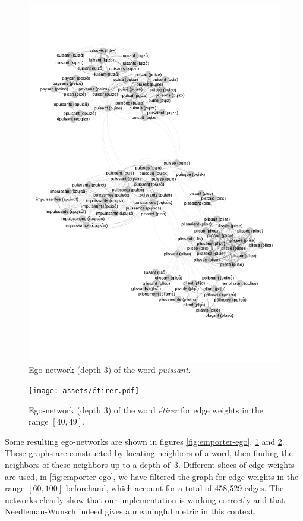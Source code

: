 \begin{figure}[H]
    \centering
    \includegraphics[width=\linewidth, trim=1cm 3.4cm 0.5cm 3.2cm, clip]{assets/puissant-ego.pdf}
    \caption{Ego-network (depth 3) of the word \textit{puissant}.}
    \label{fig:puissant-ego}
\end{figure}

\begin{figure}[H]
    \centering
    \texttt{[image: assets/étirer.pdf]}
    \caption{Ego-network (depth 3) of the word \textit{étirer} for edge weights in the range $[40,49]$.}
    \label{fig:etirer-ego}
\end{figure}

Some resulting ego-networks are shown in figures \ref{fig:emporter-ego}, \ref{fig:puissant-ego} and \ref{fig:etirer-ego}. These graphs are constructed by locating neighbors of a word, then finding the neighbors of these neighbors up to a depth of~3. Different slices of edge weights are used, \eg in \autoref{fig:emporter-ego}, we have filtered the graph for edge weights in the range $[60,100]$ beforehand, which account for a total of 458,529 edges. The networks clearly show that our implementation is working correctly and that Needleman-Wunsch indeed gives a meaningful metric in this context.

